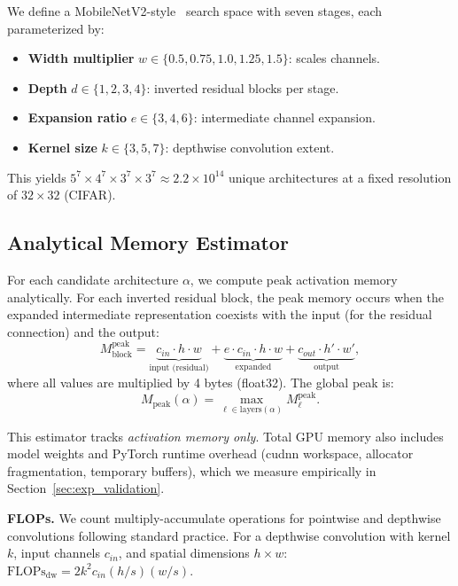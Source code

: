 \documentclass[10pt,twocolumn,letterpaper]{article}
\begin{document}
We define a MobileNetV2-style~\cite{sandler2018mobilenetv2} search space with seven stages, each parameterized by:
\begin{itemize}[leftmargin=*,nosep]
    \item \textbf{Width multiplier} $w \in \{0.5, 0.75, 1.0, 1.25, 1.5\}$: scales channels.
    \item \textbf{Depth} $d \in \{1, 2, 3, 4\}$: inverted residual blocks per stage.
    \item \textbf{Expansion ratio} $e \in \{3, 4, 6\}$: intermediate channel expansion.
    \item \textbf{Kernel size} $k \in \{3, 5, 7\}$: depthwise convolution extent.
\end{itemize}
This yields $5^7 \times 4^7 \times 3^7 \times 3^7 \approx 2.2 \times 10^{14}$ unique architectures at a fixed resolution of $32 \times 32$ (CIFAR).

\subsection{Analytical Memory Estimator}
\label{sec:profiling}

For each candidate architecture $\alpha$, we compute peak activation memory analytically. For each inverted residual block, the peak memory occurs when the expanded intermediate representation coexists with the input (for the residual connection) and the output:
\begin{equation}
M_{\text{block}}^{\text{peak}} = \underbrace{c_{in} \cdot h \cdot w}_{\text{input (residual)}} + \underbrace{e \cdot c_{in} \cdot h \cdot w}_{\text{expanded}} + \underbrace{c_{out} \cdot h' \cdot w'}_{\text{output}},
\label{eq:peak_memory}
\end{equation}
where all values are multiplied by 4 bytes (float32). The global peak is:
\begin{equation}
M_{\text{peak}}(\alpha) = \max_{\ell \in \text{layers}(\alpha)} M_\ell^{\text{peak}}.
\end{equation}

This estimator tracks \emph{activation memory only}. Total GPU memory also includes model weights and PyTorch runtime overhead (cudnn workspace, allocator fragmentation, temporary buffers), which we measure empirically in Section~\ref{sec:exp_validation}.

\textbf{FLOPs.} We count multiply-accumulate operations for pointwise and depthwise convolutions following standard practice. For a depthwise convolution with kernel $k$, input channels $c_{in}$, and spatial dimensions $h \times w$:
$\text{FLOPs}_{\text{dw}} = 2 k^2 c_{in} (h/s)(w/s)$.
\end{document}
